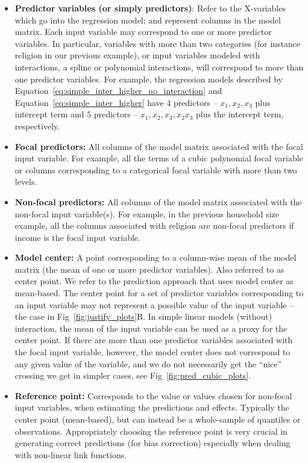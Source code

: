 \begin{itemize}
\item \textbf{Predictor variables (or simply predictors)}: Refer to the X-variables which go into the regression model; and represent columns in the model matrix. Each input variable may correspond to one or more predictor variables. In particular, variables with more than two categories (for instance religion in our previous example), or input variables modeled with interactions, a spline or polynomial interactions, will correspond to more than one predictor variables. For example, the regression models described by Equation~\ref{eq:simple_inter_higher_no_interaction} and Equation~\ref{eq:simple_inter_higher} have $4$ predictors -- $x_1, x_2, x_3$ plus intercept term and $5$ predictors -- $x_1, x_2, x_3, x_2x_3$ plus the intercept term, respectively.
\item \textbf{Focal predictors:} All columns of the model matrix associated with the focal input variable. For example, all the terms of a cubic polynomial focal variable or columns corresponding to a categorical focal variable with more than two levels.
\item \textbf{Non-focal predictors:} All columns of the model matrix associated with the non-focal input variable(s). For example, in the previous household size example, all the columns associated with religion are non-focal predictors if income is the focal input variable.
\item \textbf{Model center:} A point corresponding to a column-wise mean of the model matrix (the mean of one or more predictor variables). Also referred to as center point. We refer to the prediction approach that uses model center as mean-based. The center point for a set of predictor variables corresponding to an input variable may not represent a possible value of the input variable -- the case in Fig~\ref{fig:justify_plots}B. In simple linear models (without) interaction, the mean of the input variable can be used as a proxy for the center point. If there are more than one predictor variables associated with the focal input variable, however, the model center does not correspond to any given value of the variable, and we do not necessarily get the ``nice'' crossing we get in simpler cases, see Fig~\ref{fig:pred_cubic_plots}.
\item \textbf{Reference point:} Corresponds to the value or values chosen for non-focal input variables, when estimating the predictions and effects. Typically the center point (mean-based), but can instead be a whole-sample of quantiles or observations. Appropriately choosing the reference point is very crucial in generating correct predictions (for bias correction) especially when dealing with non-linear link functions.

\end{itemize}
